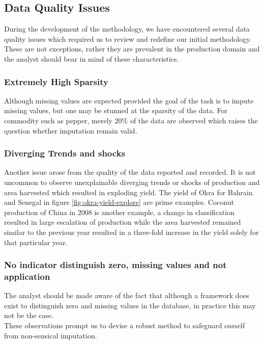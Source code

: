 \documentclass[nojss]{jss}\usepackage[]{graphicx}\usepackage[]{color}
\begin{document}
\FloatBarrier
\subsection{Data Quality Issues}
During the development of the methodology, we have encountered several
data quality issues which required us to review and redefine our
initial methodology. These are not exceptions, rather they are
prevalent in the production domain and the analyst should bear in mind
of these characteristics.


\subsubsection{Extremely High Sparsity}
Although missing values are expected provided the goal of the task is
to impute missing values, but one may be stunned at the sparsity of
the data. For commodity such as pepper, merely 20\% of the data are
observed which raises the question whether imputation remain valid.

\subsubsection{Diverging Trends and shocks}
Another issue arose from the quality of the data reported and
recorded. It is not uncommon to observe unexplainable diverging trends
or shocks of production and area harvested which resulted in exploding
yield. The yield of Okra for Bahrain and Senegal in figure
\ref{fig:okra-yield-explore} are prime examples. Coconut production of
China in 2008 is another example, a change in classification resulted
in large escalation of production while the area harvested remained
similar to the previous year resulted in a three-fold increase in the
yield solely for that particular year.\\

\subsubsection{No indicator distinguish zero, missing values and not application}
The analyst should be made aware of the fact that although a framework
does exist to distinguish zero and missing values in the database, in
practice this may not be the case.\\


These observations prompt us to devise a robust method to safeguard
ourself from non-sensical imputation.\\
\end{document}
